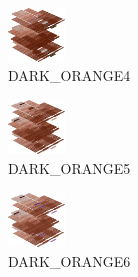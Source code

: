 \hspace{0.1cm}
\begin{minipage}[b]{0.15\linewidth}
\begin{figure}[H]                                                          
  \centering                                                             
  \begin{adjustbox}{width=1.5cm,center}                                   
  \includegraphics[width=1.5cm]{src/colorspace_colourflow/flows/colourflow_52-45.png}%
  \end{adjustbox}                                                        
\caption*{DARK\_ORANGE4}                                           
\end{figure}                                                               
\end{minipage}
\hspace{0.1cm}
\begin{minipage}[b]{0.15\linewidth}
\begin{figure}[H]                                                          
  \centering                                                             
  \begin{adjustbox}{width=1.5cm,center}                                   
  \includegraphics[width=1.5cm]{src/colorspace_colourflow/flows/colourflow_53-45.png}%
  \end{adjustbox}                                                        
\caption*{DARK\_ORANGE5}                                           
\end{figure}                                                               
\end{minipage}
\hspace{0.1cm}
\begin{minipage}[b]{0.15\linewidth}
\begin{figure}[H]                                                          
  \centering                                                             
  \begin{adjustbox}{width=1.5cm,center}                                   
  \includegraphics[width=1.5cm]{src/colorspace_colourflow/flows/colourflow_54-45.png}%
  \end{adjustbox}                                                        
\caption*{DARK\_ORANGE6}                                           
\end{figure}                                                               
\end{minipage}
